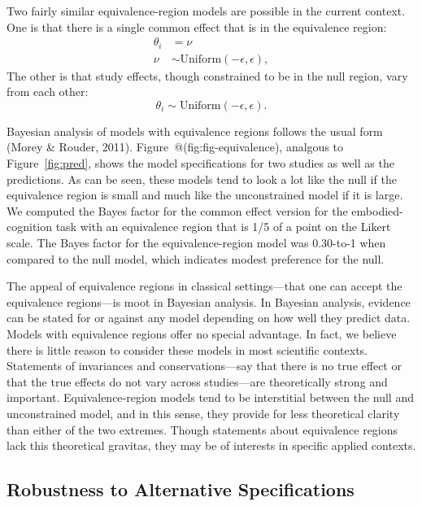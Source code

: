 \documentclass[english,man]{apa6}
\theoremstyle{definition}
\theoremstyle{definition}
\theoremstyle{definition}
\theoremstyle{remark}
\begin{document}
Two fairly similar equivalence-region models are possible in the current
context. One is that there is a single common effect that is in the
equivalence region:\\
\[
\begin{aligned}
\theta_i &= \nu\\
\nu &\sim \mbox{Uniform}(-\epsilon,\epsilon),
\end{aligned}
\] The other is that study effects, though constrained to be in the null
region, vary from each other: \[
\theta_i \sim \mbox{Uniform}(-\epsilon,\epsilon).
\]

Bayesian analysis of models with equivalence regions follows the usual
form (Morey \& Rouder, 2011). Figure~@(fig:fig-equivalence), analgous to
Figure~\ref{fig:pred}, shows the model specifications for two studies as
well as the predictions. As can be seen, these models tend to look a lot
like the null if the equivalence region is small and much like the
unconstrained model if it is large. We computed the Bayes factor for the
common effect version for the embodied-cognition task with an
equivalence region that is 1/5 of a point on the Likert scale. The Bayes
factor for the equivalence-region model was 0.30-to-1 when compared to
the null model, which indicates modest preference for the null.

The appeal of equivalence regions in classical settings---that one can
accept the equivalence regions---is moot in Bayesian analysis. In
Bayesian analysis, evidence can be stated for or against any model
depending on how well they predict data. Models with equivalence regions
offer no special advantage. In fact, we believe there is little reason
to consider these models in most scientific contexts. Statements of
invariances and conservations---say that there is no true effect or that
the true effects do not vary across studies---are theoretically strong
and important. Equivalence-region models tend to be interstitial between
the null and unconstrained model, and in this sense, they provide for
less theoretical clarity than either of the two extremes. Though
statements about equivalence regions lack this theoretical gravitas,
they may be of interests in specific applied contexts.

\subsection{Robustness to Alternative
Specifications}\label{robustness-to-alternative-specifications}
\end{document}
